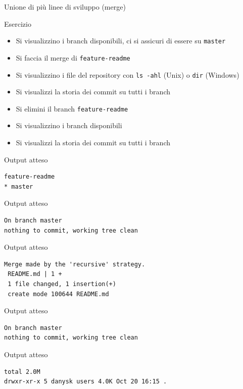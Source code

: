 \documentclass[xcolor=dvipsnames,presentation]{beamer}
\begin{document}
\begin{frame}{Unione di più linee di sviluppo (merge)}
\begin{block}{Esercizio}
        \begin{itemize}
            \footnotesize
            \item Si visualizzino i branch disponibili, ci si assicuri di essere su \texttt{master}
            \item Si faccia il merge di \texttt{feature-readme}
            \item Si visualizzino i file del repository con \texttt{ls -ahl} (Unix) o \texttt{dir} (Windows)
            \item Si visualizzi la storia dei commit su tutti i branch
            \item Si elimini il branch \texttt{feature-readme}
            \item Si visualizzino i branch disponibili
            \item Si visualizzi la storia dei commit su tutti i branch
        \end{itemize}
    \end{block}
    \begin{block}{Output atteso}
        \begin{Verbatim}[fontsize=\scriptsize]
  feature-readme
* master
        \end{Verbatim}
    \end{block}
    \begin{block}{Output atteso}
        \begin{Verbatim}[fontsize=\scriptsize]
On branch master
nothing to commit, working tree clean
        \end{Verbatim}
    \end{block}
    \begin{block}{Output atteso}
        \begin{Verbatim}[fontsize=\scriptsize]
Merge made by the 'recursive' strategy.
 README.md | 1 +
 1 file changed, 1 insertion(+)
 create mode 100644 README.md
        \end{Verbatim}
    \end{block}
    \begin{block}{Output atteso}
        \begin{Verbatim}[fontsize=\scriptsize]
On branch master
nothing to commit, working tree clean
        \end{Verbatim}
    \end{block}
    \begin{block}{Output atteso}
        \begin{Verbatim}[fontsize=\scriptsize]
total 2.0M
drwxr-xr-x 5 danysk users 4.0K Oct 20 16:15 .

\end{Verbatim}
\end{block}
\end{frame}
\end{document}
